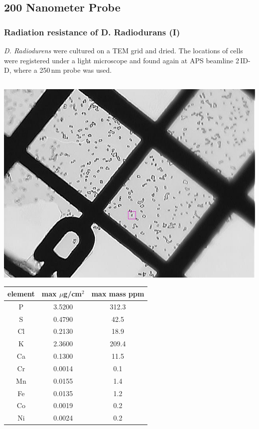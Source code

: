 
\subsection[200 nm]{200 Nanometer Probe}
\begin{frame}
  \frametitle{Radiation resistance of D. Radiodurans (I)}

  \textit{D. Radiodurens} were cultured on a TEM grid and dried.  The
  locations of cells were registered under a light microscope and
  found again at APS beamline 2\,ID-D, where a 250\,nm
  probe was used.
  
  \begin{columns}
    \begin{column}{0.4\linewidth}
      \begin{center}
        \includegraphics[width=0.8\linewidth]{xrf/dr_tem_grid.jpg}\\[1ex]
        {\tiny
          \begin{tabular}{ccc}
            element & max $\mu$g/cm$^2$ & max mass ppm \\
            \hline
            P  & 3.5200 & 312.3\\
            S  & 0.4790 & 42.5\\
            Cl & 0.2130 & 18.9\\
            K  & 2.3600 & 209.4\\
            Ca & 0.1300 & 11.5\\
            Cr & 0.0014 & 0.1\\
            Mn & 0.0155 & 1.4\\
            Fe & 0.0135 & 1.2\\
            Co & 0.0019 & 0.2\\
            Ni & 0.0024 & 0.2\\

\end{tabular}}
\end{center}
\end{column}
\end{columns}
\end{frame}
